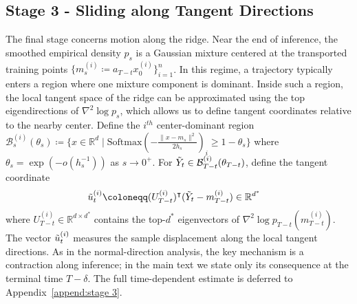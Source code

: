 \documentclass[11pt]{article}
\newcommand{\mb}{\mathbb}
\newcommand{\mc}{\mathcal}
\newcommand{\Softmax}{\mathrm{Softmax}}
\begin{document}
\subsection{Stage 3 - Sliding along Tangent Directions}\label{sec:stage3} 
The final stage concerns motion along the ridge. Near the end of inference, the smoothed empirical density $p_{s}$ is a Gaussian mixture centered at the transported training points $\{m_{s}^{(i)}\coloneqq a_{T-t}x_0^{(i)}\}_{i=1}^n$. In this regime, a trajectory typically enters a region where one mixture component is dominant. Inside such a region, the local tangent space of the ridge can be approximated using the top eigendirections of $\nabla^2\log p_{s}$, which allows us to define tangent coordinates relative to the nearby center. Define the $i^{th}$ center-dominant region $\mc{B}_{s}^{(i)}(\theta_{s}) \coloneqq \{ x\in \mb{R}^d \mid  \Softmax(-\tfrac{\| x-m_{s} \|^2}{2h_{s}})_i \ge 1-\theta_{s} \}$ where $\theta_{s}=\exp(- o(h_{s}^{-1}) )$ as $s\to 0^+$. For $\Tilde{Y}_t\in  \mc{B}_{T-t}^{(i)}(\theta_{T-t})$, define the tangent coordinate 
\begin{align}\label{eq:tangent error equation}
    \Tilde{u}_t^{(i)} &\coloneqq (U_{T-t}^{(i)})^\intercal  (\Tilde{Y}_t-m_{T-t}^{(i)}) \in \mb{R}^{d^*} 
\end{align}
where $U_{T-t}^{(i)}\in \mb{R}^{d\times d^*}$ contains the top-$d^*$ eigenvectors of $\nabla^2\log p_{T-t}(m_{T-t}^{(i)})$. The vector $\Tilde{u}_t^{(i)}$ measures the sample displacement along the local tangent directions. As in the normal-direction analysis, the key mechanism is a contraction along inference; in the main text we state only its consequence at the terminal time $T-\delta$. The full time-dependent estimate is deferred to Appendix~\ref{append:stage 3}.
\end{document}
